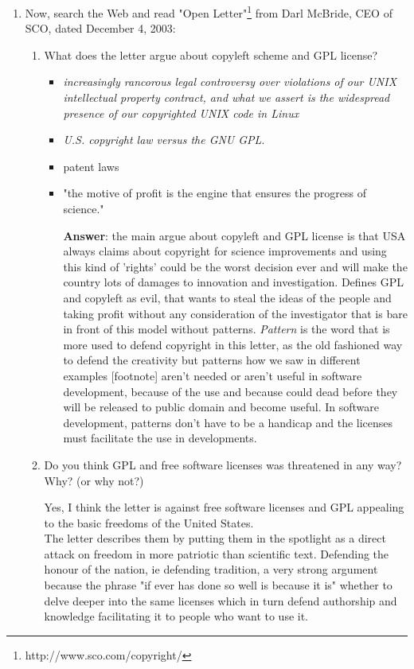 \documentclass[11pt]{scrartcl}
\begin{document}
\begin{enumerate}
	\item Now, search the Web and read "Open Letter"\footnote{http://www.sco.com/copyright/} from Darl McBride, CEO of SCO, dated December 4, 2003:	

	\begin{enumerate}
		\item What does the letter argue about copyleft scheme and GPL license?
			\begin{itemize}
				\item \emph{increasingly rancorous legal controversy over violations of our UNIX intellectual property contract, and what we assert is the widespread presence of our copyrighted UNIX code in Linux}
				\item \emph{U.S. copyright law versus the GNU GPL}.
				\item patent laws
				\item "the motive of profit is the engine that ensures the progress of science."
				
				\textbf{Answer}: the main argue about copyleft and GPL license is that USA always claims about copyright for science improvements and using this kind of 'rights' could be the worst decision ever and will make the country lots of damages to innovation and investigation. Defines GPL and copyleft as evil, that wants to steal the ideas of the people and taking profit without any consideration of the investigator that is bare in front of this model without patterns. \emph{Pattern} is the word that is more used to defend copyright in this letter, as the old fashioned way to defend the creativity but patterns how we saw in different examples [footnote] aren't needed or aren't useful in software development, because of the use and because could dead before they will be released to public domain and become useful. In software development, patterns don't have to be a handicap and the licenses must facilitate the use in developments.
				
			\end{itemize}
		\item Do you think GPL and free software licenses was threatened in any way? Why? (or why not?)
		
		Yes, I think the letter is against free software licenses and GPL appealing to the basic freedoms of the United States.\\
The letter describes them by putting them in the spotlight as a direct attack on freedom in more patriotic than scientific text. Defending the honour of the nation, ie defending tradition, a very strong argument because the phrase "if ever has done so well is because it is" whether to delve deeper into the same licenses which in turn defend authorship and knowledge facilitating it to people who want to use it.
	\end{enumerate}

\end{enumerate}
\end{document}

